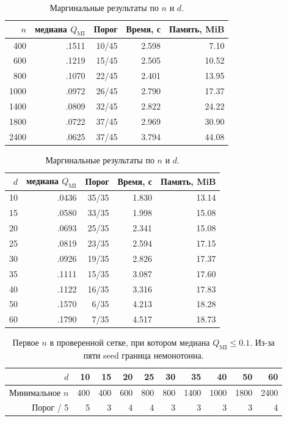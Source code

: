 \documentclass[11pt,a4paper]{article}
\newcommand{\qmi}{Q_{\mathrm{MI}}}
\begin{document}
\begin{table}[ht]
\centering
\small
\begin{tabular}{r|rrrr}
\hline
$n$ & медиана $\qmi$ & Порог & Время, с & Память, MiB \\
\hline
400  & .1511 & 10/45 & 2.598 & 7.10 \\
600  & .1219 & 15/45 & 2.505 & 10.52 \\
800  & .1070 & 22/45 & 2.401 & 13.95 \\
1000 & .0972 & 26/45 & 2.790 & 17.37 \\
1400 & .0809 & 32/45 & 2.822 & 24.22 \\
1800 & .0722 & 37/45 & 2.969 & 30.90 \\
2400 & .0625 & 37/45 & 3.794 & 44.08 \\
\hline
\end{tabular}
\qquad
\begin{tabular}{r|rrrr}
\hline
$d$ & медиана $\qmi$ & Порог & Время, с & Память, MiB \\
\hline
10 & .0436 & 35/35 & 1.830 & 13.14 \\
15 & .0580 & 33/35 & 1.998 & 15.08 \\
20 & .0693 & 25/35 & 2.341 & 15.08 \\
25 & .0819 & 23/35 & 2.594 & 17.15 \\
30 & .0926 & 19/35 & 2.826 & 17.37 \\
35 & .1111 & 15/35 & 3.087 & 17.60 \\
40 & .1122 & 16/35 & 3.316 & 17.83 \\
50 & .1570 & 6/35  & 4.213 & 18.28 \\
60 & .1790 & 7/35  & 4.517 & 18.73 \\
\hline
\end{tabular}
\caption{Маргинальные результаты по $n$ и $d$.}
\label{tab:mi-nd-marginals}
\end{table}

\begin{table}[ht]
\centering
\small
\begin{tabular}{r|rrrrrrrrr}
\hline
$d$ & 10 & 15 & 20 & 25 & 30 & 35 & 40 & 50 & 60 \\
\hline
Минимальное $n$ & 400 & 400 & 600 & 800 & 800 & 1400 & 1000 & 1800 & 2400 \\
Порог / 5 & 5 & 3 & 4 & 4 & 3 & 3 & 3 & 3 & 4 \\
\hline
\end{tabular}
\caption{Первое $n$ в проверенной сетке, при котором медиана
$\qmi\leq0.1$. Из-за пяти seed граница немонотонна.}
\label{tab:mi-nd-boundary}
\end{table}
\end{document}
